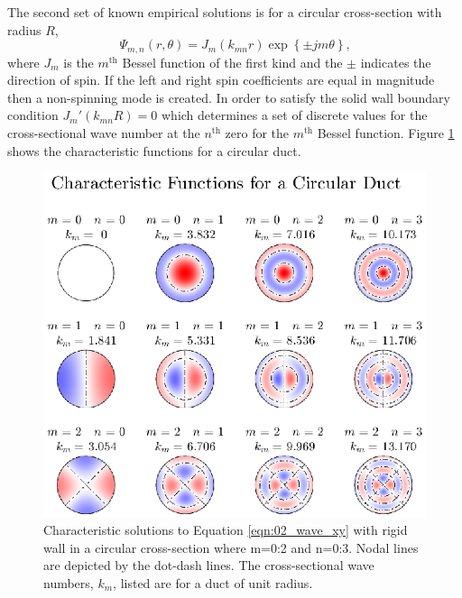 The second set of known empirical solutions is for a circular cross-section with radius $R$,
\begin{equation}
  \Psi_{m,n}(r,\theta) = J_m(k_{mn}r)\exp\left\{\pm jm\theta\right\} \textrm{,}
  \label{eqn:02_psi_circ}
\end{equation}
where $J_m$ is the $m^\textrm{th}$ Bessel function of the first kind and the $\pm$ indicates the direction of spin.
If the left and right spin coefficients are equal in magnitude then a non-spinning mode is created.
In order to satisfy the solid wall boundary condition $J_m'(k_{mn}R) = 0$ which determines a set of discrete values for the cross-sectional wave number at the $n^\textrm{th}$ zero for the $m^\textrm{th}$ Bessel function.
Figure \ref{fig:02_cross_section_circ} shows the characteristic functions for a circular duct.
\begin{figure}
  \centering
  \includegraphics{../matlab/02_background/cross_section_circ.eps}
  \caption{Characteristic solutions to Equation \ref{eqn:02_wave_xy} with rigid wall in a circular cross-section where m=0:2 and n=0:3.  Nodal lines are depicted by the dot-dash lines.  The cross-sectional wave numbers, $k_m$, listed are for a duct of unit radius.}
  \label{fig:02_cross_section_circ}
\end{figure}
